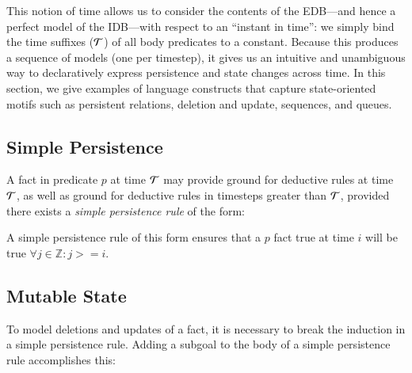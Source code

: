 This notion of time allows us to consider the contents of the EDB---and hence
a perfect model of the IDB---with respect to an ``instant in time'': we simply
bind the time suffixes ($\Tau$) of all body predicates to a constant.  Because
this produces a sequence of models (one per timestep), it gives us an intuitive
and unambiguous way to declaratively express persistence and state changes
across time.  In this section, we give examples of language constructs
that capture state-oriented motifs such as persistent relations,
deletion and update, sequences, and queues.

\subsection{Simple Persistence}
A fact in predicate $p$ at time $\Tau$ may provide ground for deductive rules
at time $\Tau$, as well as ground for deductive rules in timesteps greater than $\Tau$,
provided there exists a {\em simple persistence rule} of the form:


\noindent
A simple persistence rule of this form
ensures that a $p$ fact true at time $i$ will be true $\forall j \in \mathbb{Z} : j >= i$.


\subsection{Mutable State}
\label{sec:mutable}

To model deletions and updates of a fact, it is necessary to break the induction
in a simple persistence rule.  Adding a  subgoal to the body of a
simple persistence rule accomplishes this:


